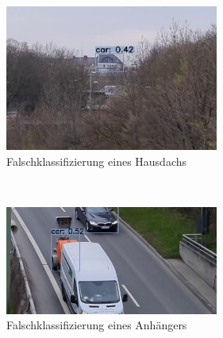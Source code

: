 \documentclass[conference]{IEEEtran}
\begin{document}
	\begin{figure}[!h]
		\begin{center}
			\includegraphics[width=7cm]{Media/Output_108 - Kopie (2).jpg}
			\caption{Falschklassifizierung eines Hausdachs}
			\label{FaK3}
		\end{center}
	\end{figure}\\
	\begin{figure}[!h]
		\begin{center}
			\includegraphics[width=7cm]{Media/Output_829 - Kopie.jpg}
			\caption{Falschklassifizierung eines Anhängers}
			\label{FaK4}
		\end{center}
	\end{figure}\\
\end{document}
